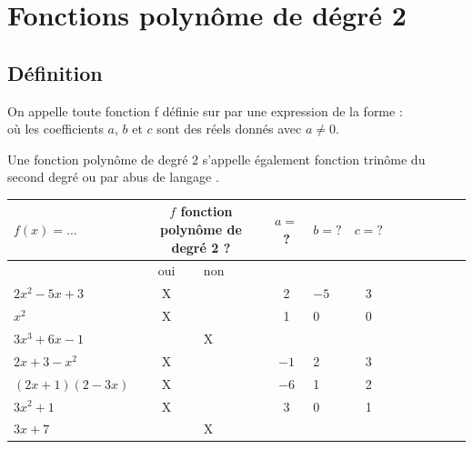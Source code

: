 
\chapter{Fonctions polynôme de dégré 2}
\thispagestyle{fancy}

\vspace*{-0.5cm}
\section{Définition}

	\vspace*{-0.2cm}
    \begin{bdefi}
        On appelle  toute fonction f définie sur \R par une expression de la forme :\\
        où les coefficients $a$, $b$ et $c$ sont des réels donnés avec $a\neq0$.
    \end{bdefi}
    
    \begin{brmq}
        Une fonction polynôme de degré 2 s'appelle également fonction trinôme du second degré ou par abus de langage .
    \end{brmq}
    
    \begin{bexemples}
    	
    	\setlength{\extrarowheight}{2pt}
        \begin{tabular}[t]{|Xc|Xc|Xc|Xc|Xc|Xc|}
        	\hline \multirow[b]{2}{*}{$f(x)=\ldots$} & \multicolumn{2}{|c|}{$f$ fonction polynôme de degré 2 ?} & $a=$ ? & $b=?$ & $c=?$ \\
        	\hline & oui & non & & & \\
        	\hline $2 x^2-5 x+3$ & X & &2 &$-5$ & 3\\
        	\hline $x^2$ & X & & 1& 0& 0\\
        	\hline $3 x^3+6 x-1$ & & X& & & \\
        	\hline $2 x+3-x^2$ & X & & $-1$& 2& 3\\
        	\hline $(2 x+1)(2-3 x)$ & X & & $-6$ & 1& 2\\
        	\hline $3 x^2+1$ & X & & 3 & 0 & 1 \\
        	\hline $3 x+7$ & & X & & & \\
        	\hline
        \end{tabular}
    \end{bexemples}

